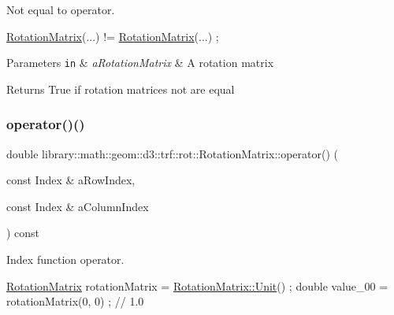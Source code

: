 Not equal to operator. 


\begin{DoxyCode}
\hyperlink{classlibrary_1_1math_1_1geom_1_1d3_1_1trf_1_1rot_1_1_rotation_matrix_a7f1184694020cb4f963d58931324ab06}{RotationMatrix}(...) != \hyperlink{classlibrary_1_1math_1_1geom_1_1d3_1_1trf_1_1rot_1_1_rotation_matrix_a7f1184694020cb4f963d58931324ab06}{RotationMatrix}(...) ;
\end{DoxyCode}



\begin{DoxyParams}[1]{Parameters}
\mbox{\tt in}  & {\em a\+Rotation\+Matrix} & A rotation matrix \\
\hline
\end{DoxyParams}
\begin{DoxyReturn}{Returns}
True if rotation matrices not are equal 
\end{DoxyReturn}
\mbox{\label{classlibrary_1_1math_1_1geom_1_1d3_1_1trf_1_1rot_1_1_rotation_matrix_ad4a32ff81978cb60f2034661ea00d390}} 
\subsubsection{\texorpdfstring{operator()()}{operator()()}\hspace{0.1cm}{\footnotesize\ttfamily [1/2]}}
{\footnotesize\ttfamily double library\+::math\+::geom\+::d3\+::trf\+::rot\+::\+Rotation\+Matrix\+::operator() (\begin{DoxyParamCaption}\item[{const Index \&}]{a\+Row\+Index,  }\item[{const Index \&}]{a\+Column\+Index }\end{DoxyParamCaption}) const}



Index function operator. 


\begin{DoxyCode}
\hyperlink{classlibrary_1_1math_1_1geom_1_1d3_1_1trf_1_1rot_1_1_rotation_matrix_a7f1184694020cb4f963d58931324ab06}{RotationMatrix} rotationMatrix = \hyperlink{classlibrary_1_1math_1_1geom_1_1d3_1_1trf_1_1rot_1_1_rotation_matrix_aeb5324151ee55348fa16c5fe78b036ed}{RotationMatrix::Unit}() ;
\textcolor{keywordtype}{double} value\_00 = rotationMatrix(0, 0) ; \textcolor{comment}{// 1.0}
\end{DoxyCode}



